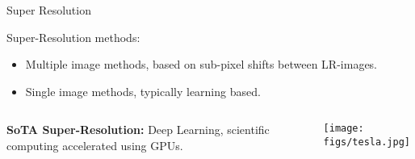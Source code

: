 \begin{frame}{Super Resolution}{}


    \begin{block}{Super-Resolution methods:}

        \begin{itemize}
            \item Multiple image methods, based on sub-pixel shifts between LR-images.
            \item Single image methods, typically learning based.
        \end{itemize}

        \centering
        \begin{columns}
            \begin{column}{0.5\textwidth}
                \textbf{SoTA Super-Resolution:} Deep Learning, scientific computing accelerated using GPUs.
            \end{column}
            \begin{column}{0.5\textwidth}

                \texttt{[image: figs/tesla.jpg]}\footnotemark
            \end{column}
        \end{columns}
    \end{block}
\end{frame}

